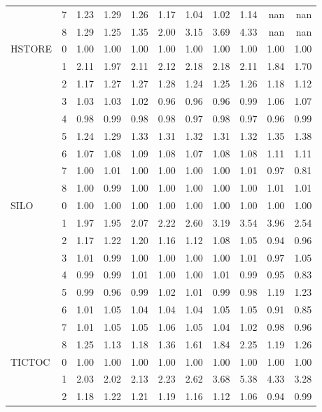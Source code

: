 \begin{tabular}{llrrrrrrrrr}
       & 7 & 1.23 & 1.29 & 1.26 & 1.17 & 1.04 & 1.02 & 1.14 &  nan &  nan \\
       & 8 & 1.29 & 1.25 & 1.35 & 2.00 & 3.15 & 3.69 & 4.33 &  nan &  nan \\
HSTORE & 0 & 1.00 & 1.00 & 1.00 & 1.00 & 1.00 & 1.00 & 1.00 & 1.00 & 1.00 \\
       & 1 & 2.11 & 1.97 & 2.11 & 2.12 & 2.18 & 2.18 & 2.11 & 1.84 & 1.70 \\
       & 2 & 1.17 & 1.27 & 1.27 & 1.28 & 1.24 & 1.25 & 1.26 & 1.18 & 1.12 \\
       & 3 & 1.03 & 1.03 & 1.02 & 0.96 & 0.96 & 0.96 & 0.99 & 1.06 & 1.07 \\
       & 4 & 0.98 & 0.99 & 0.98 & 0.98 & 0.97 & 0.98 & 0.97 & 0.96 & 0.99 \\
       & 5 & 1.24 & 1.29 & 1.33 & 1.31 & 1.32 & 1.31 & 1.32 & 1.35 & 1.38 \\
       & 6 & 1.07 & 1.08 & 1.09 & 1.08 & 1.07 & 1.08 & 1.08 & 1.11 & 1.11 \\
       & 7 & 1.00 & 1.01 & 1.00 & 1.00 & 1.00 & 1.00 & 1.01 & 0.97 & 0.81 \\
       & 8 & 1.00 & 0.99 & 1.00 & 1.00 & 1.00 & 1.00 & 1.00 & 1.01 & 1.01 \\
SILO & 0 & 1.00 & 1.00 & 1.00 & 1.00 & 1.00 & 1.00 & 1.00 & 1.00 & 1.00 \\
       & 1 & 1.97 & 1.95 & 2.07 & 2.22 & 2.60 & 3.19 & 3.54 & 3.96 & 2.54 \\
       & 2 & 1.17 & 1.22 & 1.20 & 1.16 & 1.12 & 1.08 & 1.05 & 0.94 & 0.96 \\
       & 3 & 1.01 & 0.99 & 1.00 & 1.00 & 1.00 & 1.00 & 1.01 & 0.97 & 1.05 \\
       & 4 & 0.99 & 0.99 & 1.01 & 1.00 & 1.00 & 1.01 & 0.99 & 0.95 & 0.83 \\
       & 5 & 0.99 & 0.96 & 0.99 & 1.02 & 1.01 & 0.99 & 0.98 & 1.19 & 1.23 \\
       & 6 & 1.01 & 1.05 & 1.04 & 1.04 & 1.04 & 1.05 & 1.05 & 0.91 & 0.85 \\
       & 7 & 1.01 & 1.05 & 1.05 & 1.06 & 1.05 & 1.04 & 1.02 & 0.98 & 0.96 \\
       & 8 & 1.25 & 1.13 & 1.18 & 1.36 & 1.61 & 1.84 & 2.25 & 1.19 & 1.26 \\
TICTOC & 0 & 1.00 & 1.00 & 1.00 & 1.00 & 1.00 & 1.00 & 1.00 & 1.00 & 1.00 \\
       & 1 & 2.03 & 2.02 & 2.13 & 2.23 & 2.62 & 3.68 & 5.38 & 4.33 & 3.28 \\
       & 2 & 1.18 & 1.22 & 1.21 & 1.19 & 1.16 & 1.12 & 1.06 & 0.94 & 0.99 \\

\end{tabular}
